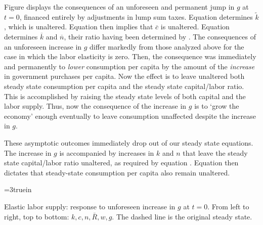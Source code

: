 {}   Figure  displays the consequences
of an unforeseen and permanent  jump in $g$ at $t=0$, financed entirely by adjustments in lump sum taxes.
Equation  determines $\tilde k$, which is unaltered.  Equation  then implies that $\overline c$ is unaltered.
Equation  determines $\overline k$ and $\overline n$, their ratio having been determined by .
  The consequences of an unforeseen  increase in
$g$ differ markedly from those analyzed above for the case in which  the labor elasticity is zero. Then, the consequence was immediately and permanently
to {\it lower\/}
consumption per capita by the amount of the {\it increase\/} in government purchases per capita.  Now the effect
is to leave unaltered  both  steady state  consumption per capita and the steady state capital/labor ratio.  This is accomplished
 by raising the steady state levels of both capital and the labor supply. Thus, now the consequence of the increase in $g$ is to `grow the economy' enough eventually to leave  consumption unaffected despite the increase in $g$.

 These asymptotic outcomes immediately  drop out of our steady state equations.  The increase in
$g$ is accompanied by  increases in $k$ and $n$ that leave the steady state capital/labor ratio unaltered, as required by equation .  Equation
 then dictates that  steady-state consumption per capita also remain unaltered.







\centerline{\epsfxsize=3truein}
\caption{Elastic labor supply: response to unforeseen increase  in $g$ at $t=0$.
From left to right, top to bottom: $k, c, n, \bar R, w, g$. The dashed line is the original
steady state.}
\endfigure



%



%

